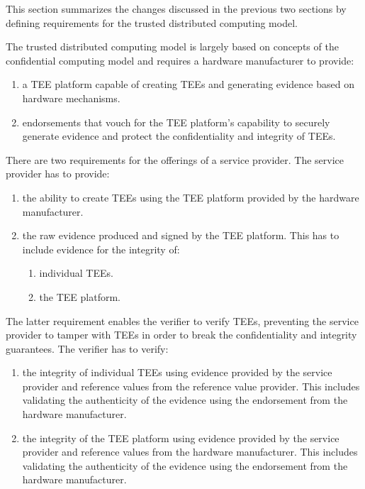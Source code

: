 This section summarizes the changes discussed in the previous two sections by
defining requirements for the trusted distributed computing model.

The trusted distributed computing model is largely based on concepts of the
confidential computing model and requires a hardware manufacturer to provide:

\begin{enumerate}[label*=R\arabic*]
  \item a TEE platform capable of creating TEEs and generating evidence based on
        hardware mechanisms.
  \item endorsements that vouch for the TEE platform's capability to securely
        generate evidence and protect the confidentiality and integrity of TEEs.
\end{enumerate}

There are two requirements for the offerings of a service provider. The service
provider has to provide:

\begin{enumerate}[resume,label*=R\arabic*]
  \item the ability to create TEEs using the TEE platform provided by the hardware
        manufacturer.
  \item the raw evidence produced and signed by the TEE platform. This has to
        include evidence for the integrity of:
        \begin{enumerate}[label*=.\arabic*]
          \item individual TEEs.
          \item the TEE platform.
        \end{enumerate}
\end{enumerate}

The latter requirement enables the verifier to verify TEEs, preventing the
service provider to tamper with TEEs in order to break the confidentiality and
integrity guarantees. The verifier has to verify:

\begin{enumerate}[resume,label*=R\arabic*]
  \item the integrity of individual TEEs using evidence provided by the service
        provider and reference values from the reference value provider. This
        includes validating the authenticity of the evidence using the
        endorsement from the hardware manufacturer.
  \item the integrity of the TEE platform using evidence provided by the service
        provider and reference values from the hardware manufacturer. This
        includes validating the authenticity of the evidence using the
        endorsement from the hardware manufacturer.
\end{enumerate}

